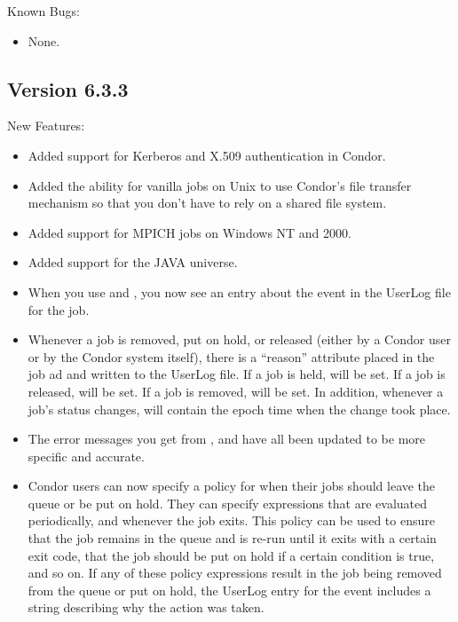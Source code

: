 \noindent Known Bugs:

\begin{itemize}

\item None.

\end{itemize}


\subsection{\label{sec:New-6-3-3}Version 6.3.3}

\noindent New Features:

\begin{itemize}

\item Added support for Kerberos and X.509 authentication in Condor.  

\item Added the ability for vanilla jobs on Unix to use Condor's file
transfer mechanism so that you don't have to rely on a shared file
system.  

\item Added support for MPICH jobs on Windows NT and 2000.

\item Added support for the JAVA universe.

\item When you use  and , you now see an
entry about the event in the UserLog file for the job.

\item Whenever a job is removed, put on hold, or released (either by a
Condor user or by the Condor system itself), there is a ``reason''
attribute placed in the job ad and written to the UserLog file.  
If a job is held,  will be set.
If a job is released,  will be set.
If a job is removed,  will be set.
In addition, whenever a job's status changes,
 will contain the epoch time when the
change took place.

\item The error messages you get from ,  and
 have all been updated to be more specific and
accurate. 

\item Condor users can now specify a policy for when their jobs should
leave the queue or be put on hold.
They can specify expressions that are evaluated periodically, and
whenever the job exits.
This policy can be used to ensure that the job remains in the queue
and is re-run until it exits with a certain exit code, that the job
should be put on hold if a certain condition is true, and so on. 
If any of these policy expressions result in the job being removed
from the queue or put on hold, the UserLog entry for the event
includes a string describing why the action was taken.


\end{itemize}
